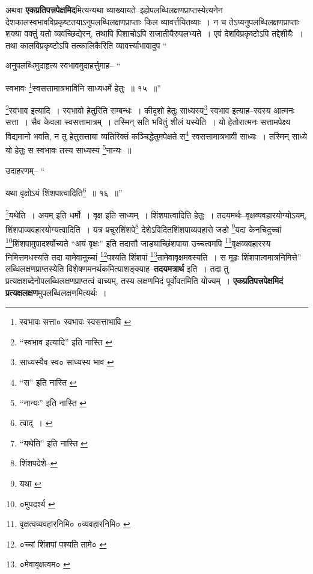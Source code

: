 \documentclass[article,12pt,a4paper]{memoir}
\begin{document}
	  \pstart अथवा \textbf{एकप्रतिपत्त्रपेक्षमिद}मित्यन्यथा व्याख्यायते--इहोपलब्धिलक्षणप्राप्तस्येत्यनेन देशकालस्वभावविप्रकृष्टतयाऽनुपलब्धिलक्षणप्राप्ताः किल व्यावर्त्तयितव्याः । न च तेऽप्यनुपलब्धिलक्षणप्राप्ताः शक्या वक्तुं यतो व्यवच्छिद्येरन्, तथापि पिशाचोऽपि सजातीयैरुपलभ्यते । एवं देशविप्रकृष्टोऽपि तद्देशीयैः । तथा कालविप्रकृष्टोऽपि तत्कालिकैरिति व्यावर्त्त्याभावादुप \leavevmode{} “
	  
	अनुपलब्धिमुदाहृत्य स्वभावमुदाहर्त्तुमाह-- “
	  
	स्वभावः \footnote{स्वभावः सत्ता० \cite{dp-msC} स्वभावः स्वसत्ताभावि \cite{dp-edE}}\-स्वसत्तामात्रभाविनि साध्यधर्मे हेतुः ॥ १५ ॥” 
	  
	\footnote{“स्वभाव इत्यादि” इति नास्ति \cite{dp-msA} \cite{dp-edP} \cite{dp-edH} \cite{dp-edE} \cite{dp-edN}}\-स्वभाव इत्यादि । स्वभावो हेतुरिति सम्बन्धः । कीदृशो हेतुः साध्यस्य\footnote{साध्यस्यैव स्व० \cite{dp-msA} \cite{dp-edP} \cite{dp-edH} \cite{dp-edE} \cite{dp-edN} साध्यस्य भाव \cite{dp-msB}} स्वभाव इत्याह--स्वस्य आत्मनः सत्ता । सैव केवला स्वसत्तामात्रम् । तस्मिन् सति भवितुं शीलं यस्येति । यो हेतोरात्मनः सत्तामपेक्ष्य विद्यमानो भवति, न तु हेतुसत्ताया व्यतिरिक्तं कञ्चिद्धेतुमपेक्षते स\footnote{“स” इति नास्ति \cite{dp-msA}} स्वसत्तामात्रभावी साध्यः । तस्मिन् साध्ये यो हेतुः स स्वभावः तस्य साध्यस्य \footnote{“नान्यः” इति नास्ति \cite{dp-msC}}\-नान्यः ॥ 
	  
	उदाहरणम्-- “
	  
	यथा वृक्षोऽयं शिंशपात्वादिति\footnote{त्वाद् । \cite{dp-msC}} ॥ १६ ॥” 
	  
	\footnote{“यथेति” इति नास्ति \cite{dp-edH} \cite{dp-edE} \cite{dp-edN}}\-यथेति । अयम् इति धर्मो । वृक्ष इति साध्यम् । शिंशपात्वादिति हेतुः । तदयमर्थः--वृक्षव्यवहारयोग्योऽयम्, शिंशपाव्यवहारयोग्यत्वादिति । यत्र प्रचुरशिंशपे\footnote{शिंशपदेशे--\cite{dp-msC}} देशेऽविदितशिंशपाव्यवहारो जडो \footnote{यथा \cite{dp-msB}}\-यदा केनचिदुच्चां \footnote{०मुपदर्श्य \cite{dp-msB}}\-शिंशपामुपादर्श्योच्यते “अयं वृक्षः” इति तदासौ जाड्याच्छिंशपाया उच्चत्वमपि \footnote{वृक्षत्वव्यवहारनिमि० \cite{dp-msC} ०व्यवहारनिमि० \cite{dp-msA} \cite{dp-edP} \cite{dp-edE} \cite{dp-edH} \cite{dp-edN}}\-वृक्षव्यवहारस्य निमित्तमधस्यति तदा यामेवानुच्चां \footnote{०च्चां शिंशपां पश्यति तामे० \cite{dp-msA} \cite{dp-edP} \cite{dp-edH} \cite{dp-edE} \cite{dp-edN}}\-पश्यति शिंशपां \footnote{०मेवावृक्षत्वम० \cite{dp-msA}}\-तामेवावृक्षमवस्यति । स मूढः शिंशपात्वमात्रनिमित्ते” लब्धिलक्षणप्राप्तस्येति विशेषणमनर्थकमित्याशङ्क्याह--\textbf{तदयमत्रार्थ} इति । तदा तु प्रत्यक्षशब्देनोपलब्धिलक्षणप्राप्तत्वं वाच्यम्, तस्य लक्षणमिदं पूर्वोवतमिति योज्यम् । \textbf{एकप्रतिपत्त्रपेक्षमिदं प्रत्यक्षलक्षण}मुपलब्धिलक्षणमित्यर्थः ।
	\pend
      
\end{document}
